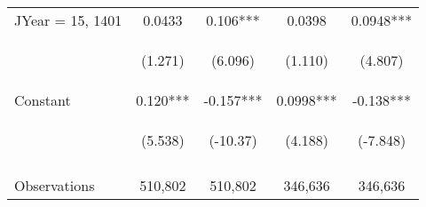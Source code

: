 \documentclass[]{article}
\begin{document}
\begin{center}
\begin{tabular}{lcccc}
        JYear = 15, 1401 & 0.0433                                          & 0.106***                                       & 0.0398                                         & 0.0948***                                      \\
        \vspace{4pt}     & \begin{footnotesize}(1.271)\end{footnotesize}   & \begin{footnotesize}(6.096)\end{footnotesize}  & \begin{footnotesize}(1.110)\end{footnotesize}  & \begin{footnotesize}(4.807)\end{footnotesize}  \\
        Constant         & 0.120***                                        & -0.157***                                      & 0.0998***                                      & -0.138***                                      \\
                         & \begin{footnotesize}(5.538)\end{footnotesize}   & \begin{footnotesize}(-10.37)\end{footnotesize} & \begin{footnotesize}(4.188)\end{footnotesize}  & \begin{footnotesize}(-7.848)\end{footnotesize} \\
        \vspace{4pt}     & \begin{footnotesize}\end{footnotesize}          & \begin{footnotesize}\end{footnotesize}         & \begin{footnotesize}\end{footnotesize}         & \begin{footnotesize}\end{footnotesize}         \\
        Observations     & 510,802                                         & 510,802                                        & 346,636                                        & 346,636                                        \\

\end{tabular}
\end{center}
\end{document}
